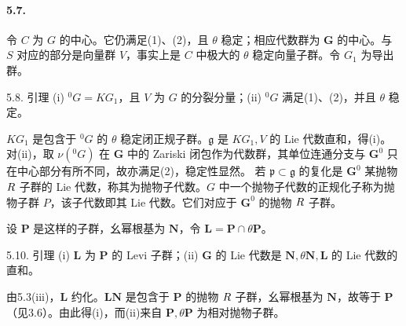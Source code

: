 \paragraph*{5.7.} 令 $C$ 为 $G$ 的中心。它仍满足(1)、(2)，且 $\theta$ 稳定；相应代数群为 $\mathbf G$ 的中心。与 $S$ 对应的部分是向量群 $V$，事实上是 $C$ 中极大的 $\theta$ 稳定向量子群。令 $G_1$ 为导出群。
\begin{originaltheorem}{5.8. 引理}
(i) ${}^0G=KG_1$，且 $V$ 为 $G$ 的分裂分量；(ii) ${}^0G$ 满足(1)、(2)，并且 $\theta$ 稳定。
\end{originaltheorem}
$KG_1$ 是包含于 ${}^0G$ 的 $\theta$ 稳定闭正规子群。$\mathfrak g$ 是 $KG_1,V$ 的 Lie 代数直和，得(i)。对(ii)，取 $\nu({}^0G)$ 在 $\mathbf G$ 中的 Zariski 闭包作为代数群，其单位连通分支与 $\mathbf G^0$ 只在中心部分有所不同，故亦满足(2)，稳定性显然。
若 $\mathfrak p\subset\mathfrak g$ 的复化是 $\mathbf G^0$ 某抛物 $R$ 子群的 Lie 代数，称其为抛物子代数。$G$ 中一个抛物子代数的正规化子称为抛物子群 $P$，该子代数即其 Lie 代数。它们对应于 $\mathbf G^0$ 的抛物 $R$ 子群。

设 $\mathbf P$ 是这样的子群，幺幂根基为 $\mathbf N$，令 $\mathbf L=\mathbf P\cap\theta\mathbf P$。
\begin{originaltheorem}{5.10. 引理}
(i) $\mathbf L$ 为 $\mathbf P$ 的 Levi 子群；(ii) $\mathbf G$ 的 Lie 代数是 $\mathbf N,\theta\mathbf N,\mathbf L$ 的 Lie 代数的直和。
\end{originaltheorem}
由5.3(iii)，$\mathbf L$ 约化。$\mathbf L\mathbf N$ 是包含于 $\mathbf P$ 的抛物 $R$ 子群，幺幂根基为 $\mathbf N$，故等于 $\mathbf P$（见3.6）。由此得(i)，而(ii)来自 $\mathbf P,\theta\mathbf P$ 为相对抛物子群。

